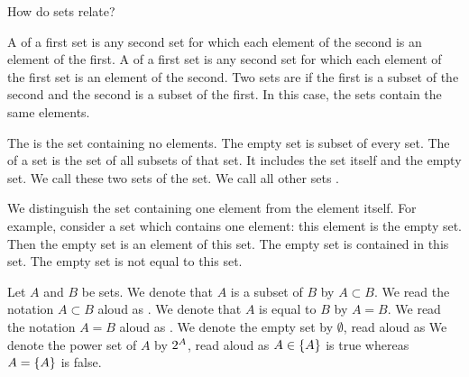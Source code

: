 
\sbasic



\sstart



How do sets relate?


A
of a first set is any second set for
which each element of the second
is an element of the first.
A
of a first set is any second set
for which each element of the
first set is an element of the second.
Two sets are
 if the first is a
subset of the second and the
second is a subset of the first.
In this case, the sets contain
the same elements.

The
is the set containing no elements.
The empty set is subset of every set.
The
of a set is the set of all subsets of that
set.
It includes the set itself and the empty set.
We call these two sets
of the set.
We call all other sets
.

We distinguish the set
containing one element from the
element itself.
For example, consider a set
which contains one element: this
element is the empty set.
Then the empty set is an element
of this set.
The empty set is contained in this
set.
The empty set is not equal to this set.

Let $A$ and $B$ be sets.
We denote that $A$ is a subset of $B$ by $A \subset B$.
We read the notation $A \subset B$ aloud as .
We denote that $A$ is equal to $B$ by $A = B$.
We read the notation $A = B$ aloud as .
We denote the empty set by $\emptyset$, read aloud as 
We denote the power set of $A$ by $2^{A}$, read aloud as 
$A \in \{A\}$ is true whereas $A = \{A\}$ is false.

\strats
